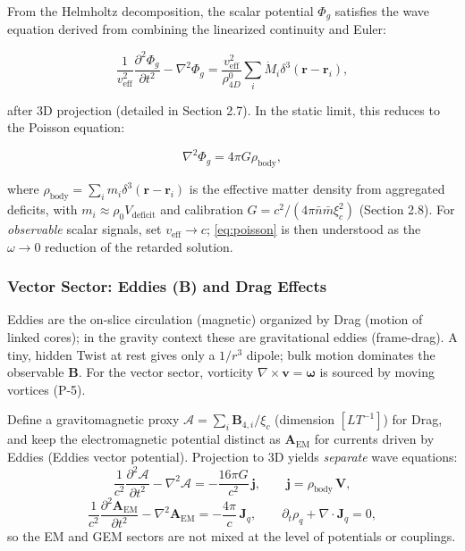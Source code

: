 From the Helmholtz decomposition, the scalar potential $\Phi_g$ satisfies the wave equation derived from combining the linearized continuity and Euler:

\begin{equation}
\frac{1}{v_{\text{eff}}^2} \frac{\partial^2 \Phi_g}{\partial t^2} - \nabla^2 \Phi_g = \frac{v_{\text{eff}}^2}{\rho_{4D}^0} \sum_i \dot{M}_i \delta^3(\mathbf{r} - \mathbf{r}_i),
\end{equation}

after 3D projection (detailed in Section 2.7). In the static limit, this reduces to the Poisson equation:

\begin{equation}
\label{eq:poisson}
\nabla^2 \Phi_g = 4\pi G \rho_{\text{body}},
\end{equation}

where $\rho_{\text{body}} = \sum_i m_i \delta^3(\mathbf{r} - \mathbf{r}_i)$ is the effective matter density from aggregated deficits, with $m_i \approx \rho_0 V_{\text{deficit}}$ and calibration $G = c^2 / (4\pi \bar{n} \bar{m} \xi_c^2)$ (Section 2.8). For \emph{observable} scalar signals, set $v_{\text{eff}}\to c$; \eqref{eq:poisson} is then understood as the $\omega\to0$ reduction of the retarded solution.

\subsubsection{Vector Sector: Eddies (B) and Drag Effects}

Eddies are the on-slice circulation (magnetic) organized by Drag (motion of linked cores); in the gravity context these are gravitational eddies (frame-drag). A tiny, hidden Twist at rest gives only a $1/r^3$ dipole; bulk motion dominates the observable $\mathbf B$. For the vector sector, vorticity $\nabla \times \mathbf{v} = \boldsymbol{\omega}$ is sourced by moving vortices (P-5).

Define a gravitomagnetic proxy $\boldsymbol{\mathcal A} = \sum_i \mathbf{B}_{4,i} / \xi_c$ (dimension $[L T^{-1}]$) for Drag, and keep the electromagnetic potential distinct as $\mathbf A_{\text{EM}}$ for currents driven by Eddies (Eddies vector potential). Projection to 3D yields \emph{separate} wave equations:
\begin{equation}
\frac{1}{c^2} \frac{\partial^2 \boldsymbol{\mathcal A}}{\partial t^2} - \nabla^2 \boldsymbol{\mathcal A} = -\frac{16\pi G}{c^2}\, \mathbf{j},\qquad
\mathbf{j}=\rho_{\text{body}}\,\mathbf V,
\end{equation}
\begin{equation}
\frac{1}{c^2} \frac{\partial^2 \mathbf{A}_{\text{EM}}}{\partial t^2} - \nabla^2 \mathbf{A}_{\text{EM}} = -\frac{4\pi}{c}\, \mathbf{J}_q,\qquad
\partial_t \rho_q+\nabla\!\cdot\!\mathbf J_q=0,
\end{equation}
so the EM and GEM sectors are not mixed at the level of potentials or couplings.

